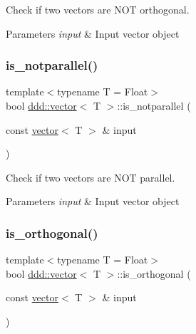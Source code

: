 Check if two vectors are N\+OT orthogonal. 


\begin{DoxyParams}{Parameters}
{\em input} & Input vector object \\
\hline
\end{DoxyParams}
\mbox{\label{classddd_1_1vector_ae2d3c12f861cd1d4bb8977d0512a5e20}} 
\subsubsection{\texorpdfstring{is\+\_\+notparallel()}{is\_notparallel()}}
{\footnotesize\ttfamily template$<$typename T = Float$>$ \\
bool \hyperlink{classddd_1_1vector}{ddd\+::vector}$<$ T $>$\+::is\+\_\+notparallel (\begin{DoxyParamCaption}\item[{const \hyperlink{classddd_1_1vector}{vector}$<$ T $>$ \&}]{input }\end{DoxyParamCaption})\hspace{0.3cm}{\ttfamily [inline]}}



Check if two vectors are N\+OT parallel. 


\begin{DoxyParams}{Parameters}
{\em input} & Input vector object \\
\hline
\end{DoxyParams}
\mbox{\label{classddd_1_1vector_a48546e7a818979326ebb22e9256a9070}} 
\subsubsection{\texorpdfstring{is\+\_\+orthogonal()}{is\_orthogonal()}}
{\footnotesize\ttfamily template$<$typename T = Float$>$ \\
bool \hyperlink{classddd_1_1vector}{ddd\+::vector}$<$ T $>$\+::is\+\_\+orthogonal (\begin{DoxyParamCaption}\item[{const \hyperlink{classddd_1_1vector}{vector}$<$ T $>$ \&}]{input }\end{DoxyParamCaption})\hspace{0.3cm}{\ttfamily [inline]}}



